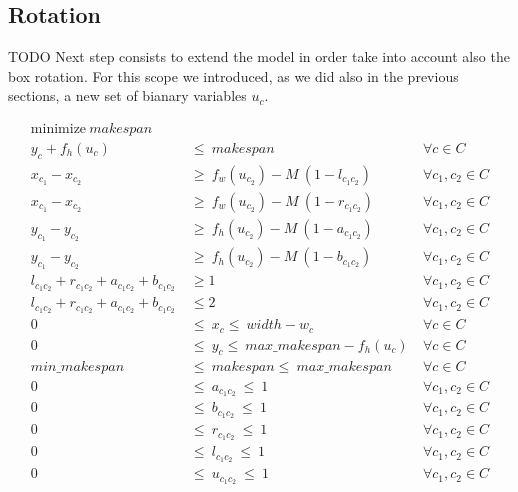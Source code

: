\subsection{Rotation}
    \colorbox{BurntOrange}{TODO }
    Next step consists to extend the model in order take into account also the box rotation.
    For this scope we introduced, as we did also in the previous sections, a new set of bianary 
    variables $u_c$. 

    \begin{subequations}
        \label{ilp:rot}
        \begin{align}
        \label{ilp:rot_obj} \text{minimize}\ makespan                                   &\  &\                       \\
        \label{ilp:rot_ycons}  y_c + f_h(u_c)       &\ \leq\ makespan                       &\ \forall c \in C       \\
        \label{ilp:rot_diffn1} x_{c_1} - x_{c_2} &\ \geq\ f_w(u_{c_2}) - M\ (1-l_{c_1c_2})  &\ \forall c_1, c_2 \in C\\ 
        \label{ilp:rot_diffn2} x_{c_1} - x_{c_2} &\ \geq\ f_w(u_{c_2}) - M\ (1-r_{c_1c_2})  &\ \forall c_1, c_2 \in C\\ 
        \label{ilp:rot_diffn3} y_{c_1} - y_{c_2} &\ \geq\ f_h(u_{c_2}) - M\ (1-a_{c_1c_2})  &\ \forall c_1, c_2 \in C\\ 
        \label{ilp:rot_diffn4} y_{c_1} - y_{c_2} &\ \geq\ f_h(u_{c_2}) - M\ (1-b_{c_1c_2})  &\ \forall c_1, c_2 \in C\\ 
        \label{ilp:rot_diffn5} l_{c_1c_2} + r_{c_1c_2} + a_{c_1c_2} + b_{c_1c_2}  &\ \geq 1 &\ \forall c_1, c_2 \in C\\
        \label{ilp:rot_diffn6} l_{c_1c_2} + r_{c_1c_2} + a_{c_1c_2} + b_{c_1c_2}  &\ \leq 2 &\ \forall c_1, c_2 \in C\\
        \label{ilp:rot_b_x} 0                       &\ \leq\ x_c \leq\ width - w_c          &\ \forall c \in C       \\
        \label{ilp:rot_b_y} 0                    &\ \leq\ y_c \leq\ max\_makespan-f_h(u_c)  &\ \forall c \in C       \\
        \label{ilp:rot_b_makspan} min\_makespan     &\ \leq\ makespan \leq\ max\_makespan   &\ \forall c \in C       \\
        \label{ilp:rot_b_a} 0\                      &\ \leq\ a_{c_1c_2}\ \leq\ 1            &\ \forall c_1,c_2 \in C \\
        \label{ilp:rot_b_b} 0\                      &\ \leq\ b_{c_1c_2}\ \leq\ 1            &\ \forall c_1,c_2 \in C \\
        \label{ilp:rot_b_r} 0\                      &\ \leq\ r_{c_1c_2}\ \leq\ 1            &\ \forall c_1,c_2 \in C \\
        \label{ilp:rot_b_l} 0\                      &\ \leq\ l_{c_1c_2}\ \leq\ 1            &\ \forall c_1,c_2 \in C \\
        \label{ilp:rot_b_u} 0\                      &\ \leq\ u_{c_1c_2}\ \leq\ 1            &\ \forall c_1,c_2 \in C
        \end{align}    
    \end{subequations}

